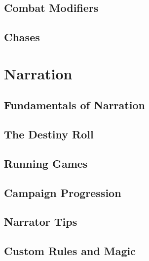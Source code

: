 \newpage
\chapter{Combat Modifiers} \label{ch:cb.combat_modifiers}


\newpage
\chapter{Chases} \label{ch:cb.chases}


\part{Narration} \label{part:narration}

\newpage
\chapter{Fundamentals of Narration} \label{ch:na.fundamentals}


\newpage
\chapter{The Destiny Roll} \label{ch:na.the_destiny_roll}


\newpage
\chapter{Running Games} \label{ch:na.running_games}


\newpage
\chapter{Campaign Progression} \label{ch:na.campaign_progression}


\newpage
\chapter{Narrator Tips} \label{ch:na.narrator_tips}


\newpage
\chapter{Custom Rules and Magic} \label{ch:na.custom_rules_and_magic}


